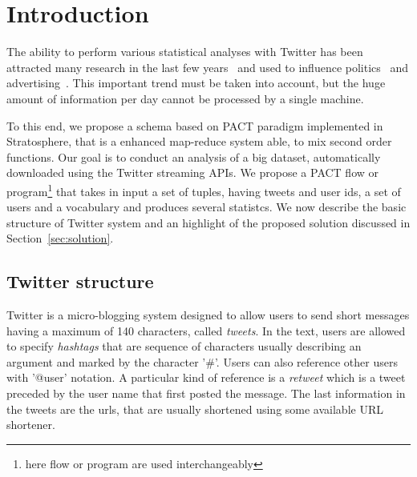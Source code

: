 \section{Introduction}
\label{sec:introduction}

The ability to perform various statistical analyses with Twitter has been attracted many research in the last few years~\cite{Hong:2012qy,Lehmann:2012kx} and used to influence politics~\cite{Tumasjan:2010vn} and advertising~\cite{Bakshy:2011ys}. 
This important trend must be taken into account, but the huge amount of information per day cannot be processed by a single machine. 

To this end, we propose a schema based on PACT paradigm implemented in Stratosphere, that is a enhanced map-reduce system able, to mix second order functions. 
Our goal is to conduct an analysis of a big dataset, automatically downloaded using the Twitter streaming APIs.
We propose a PACT flow or program\footnote{here flow or program are used interchangeably} that takes in input a set of tuples, having tweets and user ids, a set of users and a vocabulary and produces several statistcs. 
We now describe the basic structure of Twitter system and an highlight of the proposed solution discussed in Section~\ref{sec:solution}. 

\subsection{Twitter structure}
Twitter is a micro-blogging system designed to allow users to send short messages having a maximum of 140 characters, called \textit{tweets}. 
In the text, users are allowed to specify \textit{hashtags} that are sequence of characters usually describing an argument and marked by the character '\#'. 
Users can also reference other users with '@user' notation. 
A particular kind of reference is a \textit{retweet} which is a tweet preceded by the user name that first posted the message. 
The last information in the tweets are the urls, that are usually shortened using some available URL shortener. 

